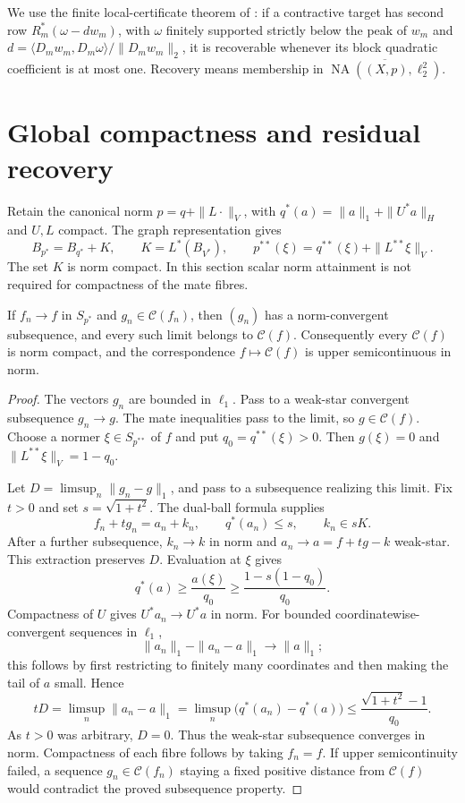 \documentclass[10pt]{amsart}
\newcommand{\NA}{\operatorname{NA}}
\newcommand{\Cset}{\mathcal C}
\begin{document}
We use the finite local-certificate theorem of \cite{Check}:
if a contractive target has second row
$R_m^*(\omega-dw_m)$, with $\omega$ finitely supported strictly
below the peak of $w_m$ and
$d=\langle D_mw_m,D_m\omega\rangle/\|D_mw_m\|_2$, it is
recoverable whenever its block quadratic coefficient is at most
one. Recovery means membership in
$\overline{\NA((X,p),\ell_2^2)}$.

\section{Global compactness and residual recovery}

Retain the canonical norm $p=q+\|L\cdot\|_V$, with
$q^*(a)=\|a\|_1+\|U^*a\|_H$ and $U,L$ compact.
The graph representation gives
\[
 B_{p^*}=B_{q^*}+K,\qquad K=L^*(B_{V^*}),
 \qquad p^{**}(\xi)=q^{**}(\xi)+\|L^{**}\xi\|_V.
\]
The set $K$ is norm compact. In this section scalar norm
attainment is not required for compactness of the mate fibres.

\begin{theorem}
\label{thm:gcr-global-compact}
If $f_n\to f$ in $S_{p^*}$ and $g_n\in\Cset(f_n)$, then
$(g_n)$ has a norm-convergent subsequence, and every such limit
belongs to $\Cset(f)$. Consequently every $\Cset(f)$ is norm
compact, and the correspondence $f\mapsto\Cset(f)$ is upper
semicontinuous in norm.
\end{theorem}
\begin{proof}
The vectors $g_n$ are bounded in $\ell_1$. Pass to a weak-star
convergent subsequence $g_n\to g$. The mate inequalities pass
to the limit, so $g\in\Cset(f)$. Choose a normer
$\xi\in S_{p^{**}}$ of $f$ and put $q_0=q^{**}(\xi)>0$.
Then $g(\xi)=0$ and $\|L^{**}\xi\|_V=1-q_0$.

Let $D=\limsup_n\|g_n-g\|_1$, and pass to a subsequence
realizing this limit. Fix $t>0$ and set $s=\sqrt{1+t^2}$.
The dual-ball formula supplies
\[
 f_n+tg_n=a_n+k_n,\qquad q^*(a_n)\le s,
 \qquad k_n\in sK.
\]
After a further subsequence, $k_n\to k$ in norm and
$a_n\to a=f+tg-k$ weak-star. This extraction preserves $D$.
Evaluation at $\xi$ gives
\[
 q^*(a)\ge\frac{a(\xi)}{q_0}
 \ge\frac{1-s(1-q_0)}{q_0}.
\]
Compactness of $U$ gives $U^*a_n\to U^*a$ in norm.
For bounded coordinatewise-convergent sequences in $\ell_1$,
\[
 \|a_n\|_1-\|a_n-a\|_1\longrightarrow\|a\|_1;
\]
this follows by first restricting to finitely many coordinates
and then making the tail of $a$ small. Hence
\[
 tD=\limsup_n\|a_n-a\|_1
 =\limsup_n\big(q^*(a_n)-q^*(a)\big)
 \le\frac{\sqrt{1+t^2}-1}{q_0}.
\]
As $t>0$ was arbitrary, $D=0$. Thus the weak-star subsequence
converges in norm. Compactness of each fibre follows by taking
$f_n=f$. If upper semicontinuity failed, a sequence
$g_n\in\Cset(f_n)$ staying a fixed positive distance from
$\Cset(f)$ would contradict the proved subsequence property.
\end{proof}
\end{document}

